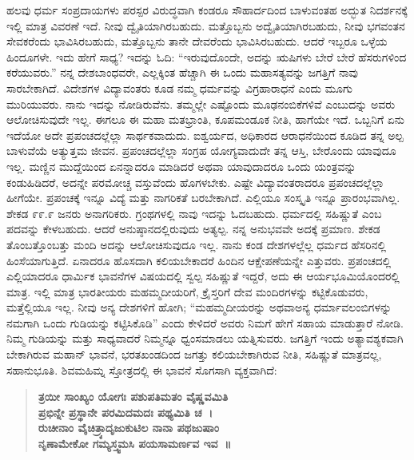 ಹಲವು ಧರ್ಮ ಸಂಪ್ರದಾಯಗಳು ಪರಸ್ಪರ ವಿರುದ್ಧವಾಗಿ ಕಂಡರೂ ಸೌಹಾರ್ದದಿಂದ ಬಾಳುವಂತಹ ಅದ್ಭುತ ನಿದರ್ಶನಕ್ಕೆ ಇಲ್ಲಿ ಮಾತ್ರ ವಿವರಣೆ ಇದೆ. ನೀವು ದ್ವೈತಿಯಾಗಿರ\-ಬಹುದು. ಮತ್ತೊಬ್ಬನು ಅದ್ವೈತಿಯಾಗಿರಬಹುದು, ನೀವು ಭಗವಂತನ ಸೇವಕರೆಂದು ಭಾವಿಸಿರಬಹುದು, ಮತ್ತೊಬ್ಬನು ತಾನೇ ದೇವರೆಂದು ಭಾವಿಸಿರಬಹುದು. ಆದರೆ ಇಬ್ಬರೂ ಒಳ್ಳೆಯ ಹಿಂದೂಗಳೇ. ಇದು ಹೇಗೆ ಸಾಧ್ಯ? ಇದನ್ನು ಓದಿ: “ಇರುವುದೊಂದೇ, ಅದನ್ನು ಋಷಿಗಳು ಬೇರೆ ಬೇರೆ ಹೆಸರುಗಳಿಂದ ಕರೆಯುವರು.” ನನ್ನ ದೇಶಬಾಂಧವರೇ, ಎಲ್ಲಕ್ಕಿಂತ ಹೆಚ್ಚಾಗಿ ಈ ಒಂದು ಮಹಾಸತ್ಯವನ್ನು ಜಗತ್ತಿಗೆ ನಾವು ಸಾರಬೇಕಾಗಿದೆ. ವಿದೇಶಗಳ ವಿದ್ಯಾವಂತರು ಕೂಡ ನಮ್ಮ ಧರ್ಮವನ್ನು ವಿಗ್ರಹಾರಾಧನೆ ಎಂದು ಮೂಗು ಮುರಿಯುವರು. ನಾನು ಇದನ್ನು ನೋಡಿರುವೆನು. ತಮ್ಮಲ್ಲೇ ಎಷ್ಟೊಂದು ಮೂಢನಂಬಿಕೆಗಳಿವೆ ಎಂಬುದನ್ನು ಅವರು ಆಲೋಚಿಸುವುದೇ ಇಲ್ಲ. ಈಗಲೂ ಈ ಮಹಾ ಮತಭ್ರಾಂತಿ, ಕೂಪಮಂಡೂಕ ನೀತಿ, ಹಾಗೆಯೇ ಇದೆ. ಒಬ್ಬನಿಗೆ ಏನು ಇದೆಯೋ ಅದೇ ಪ್ರಪಂಚದಲ್ಲೆಲ್ಲಾ ಸಾರ್ಥಕವಾದುದು. ಐಶ್ವರ್ಯದ, ಅಧಿಕಾರದ ಆರಾಧನೆಯಿಂದ ಕೂಡಿದ ತನ್ನ ಅಲ್ಪ ಬಾಳುವೆಯೆ ಅತ್ಯುತ್ತಮ ಜೀವನ. ಪ್ರಪಂಚದಲ್ಲೆಲ್ಲಾ ಸಂಗ್ರಹ ಯೋಗ್ಯವಾದುದೇ ತನ್ನ ಆಸ್ತಿ, ಬೇರೊಂದು ಯಾವುದೂ ಇಲ್ಲ. ಮಣ್ಣಿನ ಮುದ್ದೆಯಿಂದ ಏನನ್ನಾದರೂ ಮಾಡಿದರೆ ಅಥವಾ ಯಾವುದಾದರೂ ಒಂದು ಯಂತ್ರವನ್ನು ಕಂಡುಹಿಡಿದರೆ, ಅದನ್ನೇ ಪರಮೋಚ್ಚ ವಸ್ತುವೆಂದು ಹೊಗಳಬೇಕು. ಎಷ್ಟೇ ವಿದ್ಯಾವಂತರಾದರೂ ಪ್ರಪಂಚದಲ್ಲೆಲ್ಲಾ ಹೀಗೆಯೇ. ಪ್ರಪಂಚಕ್ಕೆ ಇನ್ನೂ ವಿದ್ಯೆ ಮತ್ತು ನಾಗರಿಕತೆ ಬರಬೇಕಾಗಿದೆ. ಎಲ್ಲಿಯೂ ಸಂಸ್ಕೃತಿ ಇನ್ನೂ ಪ್ರಾರಂಭವಾಗಿಲ್ಲ. ಶೇಕಡ ೯೯.೯ ಜನರು ಅನಾಗರಿಕರು. ಗ್ರಂಥಗಳಲ್ಲಿ ನಾವು ಇದನ್ನು ಓದಬಹುದು. ಧರ್ಮದಲ್ಲಿ ಸಹಿಷ್ಣುತೆ ಎಂಬ ಪದವನ್ನು ಕೇಳಬಹುದು. ಆದರೆ ಅನುಷ್ಠಾನದಲ್ಲಿರುವುದು ಅತ್ಯಲ್ಪ. ನನ್ನ ಅನುಭವವೇ ಅದಕ್ಕೆ ಪ್ರಮಾಣ. ಶೇಕಡ ತೊಂಬತ್ತೊಂಬತ್ತು ಮಂದಿ ಅದನ್ನು ಆಲೋಚಿಸುವುದೂ ಇಲ್ಲ. ನಾನು ಕಂಡ ದೇಶಗಳಲ್ಲೆಲ್ಲ ಧರ್ಮದ ಹೆಸರಿನಲ್ಲಿ ಹಿಂಸೆಯಾಗುತ್ತಿದೆ. ಏನಾದರೂ ಹೊಸದಾಗಿ ಕಲಿಯಬೇಕಾದರೆ ಹಿಂದಿನ ಆಕ್ಷೇಪಣೆಯನ್ನೇ ಎತ್ತುವರು. ಪ್ರಪಂಚದಲ್ಲಿ ಎಲ್ಲಿಯಾದರೂ ಧಾರ್ಮಿಕ ಭಾವನೆಗಳ ವಿಷಯದಲ್ಲಿ ಸ್ವಲ್ಪ ಸಹಿಷ್ಣುತೆ ಇದ್ದರೆ, ಅದು ಈ ಆರ್ಯಭೂಮಿಯೊಂದರಲ್ಲಿ ಮಾತ್ರ. ಇಲ್ಲಿ ಮಾತ್ರ ಭಾರತೀಯರು ಮಹಮ್ಮದೀಯರಿಗೆ, ಕ್ರೈಸ್ತರಿಗೆ ದೇವ ಮಂದಿರಗಳನ್ನು ಕಟ್ಟಿಕೊಡುವರು, ಮತ್ತೆಲ್ಲಿಯೂ ಇಲ್ಲ. ನೀವು ಅನ್ಯ ದೇಶಗಳಿಗೆ ಹೋಗಿ; “ಮಹಮ್ಮದೀಯರನ್ನು ಅಥವಾ\break ಅನ್ಯ ಧರ್ಮಾವಲಂಬಿಗಳನ್ನು ನಮಗಾಗಿ ಒಂದು ಗುಡಿಯನ್ನು ಕಟ್ಟಿಸಿಕೊಡಿ” ಎಂದು ಕೇಳಿದರೆ ಅವರು ನಿಮಗೆ ಹೇಗೆ ಸಹಾಯ ಮಾಡುತ್ತಾರೆ ನೋಡಿ. ನಿಮ್ಮ ಗುಡಿಯನ್ನು ಮತ್ತು ಸಾಧ್ಯವಾದರೆ ನಿಮ್ಮನ್ನೂ ಧ್ವಂಸಮಾಡಲು ಯತ್ನಿಸುವರು. ಜಗತ್ತಿಗೆ ಇಂದು ಅತ್ಯಾವಶ್ಯಕವಾಗಿ ಬೇಕಾಗಿರುವ ಮಹಾನ್ ಭಾವನೆ, ಭರತಖಂಡದಿಂದ ಜಗತ್ತು ಕಲಿಯಬೇಕಾಗಿರುವ ನೀತಿ, ಸಹಿಷ್ಣುತೆ ಮಾತ್ರವಲ್ಲ, ಸಹಾನುಭೂತಿ. ಶಿವಮಹಿಮ್ನ ಸ್ತೋತ್ರದಲ್ಲಿ ಈ ಭಾವನೆ ಸೊಗಸಾಗಿ ವ್ಯಕ್ತವಾಗಿದೆ:

\begin{verse}
\textbf{ತ್ರಯೀ ಸಾಂಖ್ಯಂ ಯೋಗಃ ಪಶುಪತಿಮತಂ ವೈಷ್ಣವಮಿತಿ}\\\textbf{ಪ್ರಭಿನ್ನೇ ಪ್ರಸ್ಥಾನೇ ಪರಮಿದಮದಃ ಪಥ್ಯಮಿತಿ ಚ~।}\\\textbf{ರುಚೀನಾಂ ವೈಚಿತ್ರ್ಯಾದೃಜುಕುಟಿಲ ನಾನಾ ಪಥಜುಷಾಂ}\\\textbf{ನೃಣಾಮೇಕೋ ಗಮ್ಯಸ್ತ್ವಮಸಿ ಪಯಸಾಮರ್ಣವ ಇವ~॥}
\end{verse}

